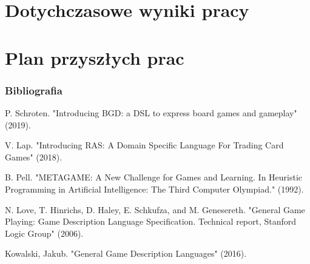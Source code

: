 \documentclass{beamer}
\begin{document}
\section{Dotychczasowe wyniki pracy}

\section{Plan przyszłych prac}

\begin{frame}[allowframebreaks]
	\frametitle{Bibliografia}
	
	\begin{thebibliography}{9}
		 P. Schroten. "Introducing BGD: a DSL to express board games and gameplay" (2019).

		 V. Lap. "Introducing RAS: A Domain Specific Language For Trading Card Games" (2018).

		  B. Pell. "METAGAME: A New Challenge for Games and Learning. In Heuristic Programming in Artificial Intelligence: The Third Computer Olympiad." (1992).

		  N. Love, T. Hinrichs, D. Haley, E. Schkufza, and M. Genesereth. "General Game Playing:
Game Description Language Specification. Technical report, Stanford Logic Group" (2006).

		 Kowalski, Jakub. "General Game Description Languages" (2016).
	\end{thebibliography}
\end{frame}
\end{document}
